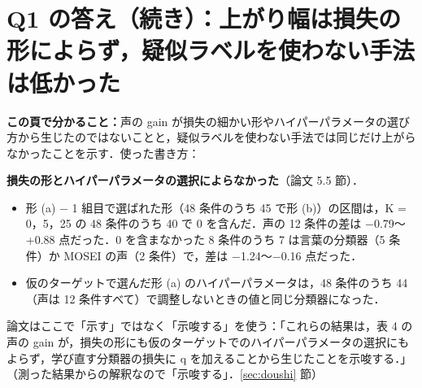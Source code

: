 \documentclass[a4paper,10pt]{ltjsarticle}
\newcommand{\koko}[2][]{\begin{headbar}\textbf{この頁で分かること：}#2\if\relax\detokenize{#1}\relax\else\hfill{\small 使った書き方：}#1\fi\end{headbar}}
\newcommand{\pagesection}[1]{\clearpage\section{#1}}
\newcommand{\shiryo}[1]{\ref{#1} 節}
\begin{document}
\pagesection{Q1 の答え（続き）：上がり幅は損失の形によらず，疑似ラベルを使わない手法は低かった}\label{sec:q1cont}
\koko{声の gain が損失の細かい形やハイパーパラメータの選び方から生じたのではないことと，疑似ラベルを使わない手法では同じだけ上がらなかったことを示す．}

\noindent\textbf{損失の形とハイパーパラメータの選択によらなかった}（論文 5.5 節）．
\begin{itemize}
  \item 形 (a) − 1 組目で選ばれた形（48 条件のうち 45 で形 (b)）の区間は，K = 0，5，25 の 48 条件のうち 40 で 0 を含んだ．声の 12 条件の差は −0.79〜+0.88 点だった．0 を含まなかった 8 条件のうち 7 は言葉の分類器（5 条件）か MOSEI の声（2 条件）で，差は −1.24〜−0.16 点だった．
  \item 仮のターゲットで選んだ形 (a) のハイパーパラメータは，48 条件のうち 44（声は 12 条件すべて）で調整しないときの値と同じ分類器になった．
\end{itemize}
論文はここで「示す」ではなく「示唆する」を使う：「これらの結果は，表 4 の声の gain が，損失の形にも仮のターゲットでのハイパーパラメータの選択にもよらず，学び直す分類器の損失に q を加えることから生じたことを示唆する．」（測った結果からの解釈なので「示唆する」．\shiryo{sec:doushi}）
\end{document}
